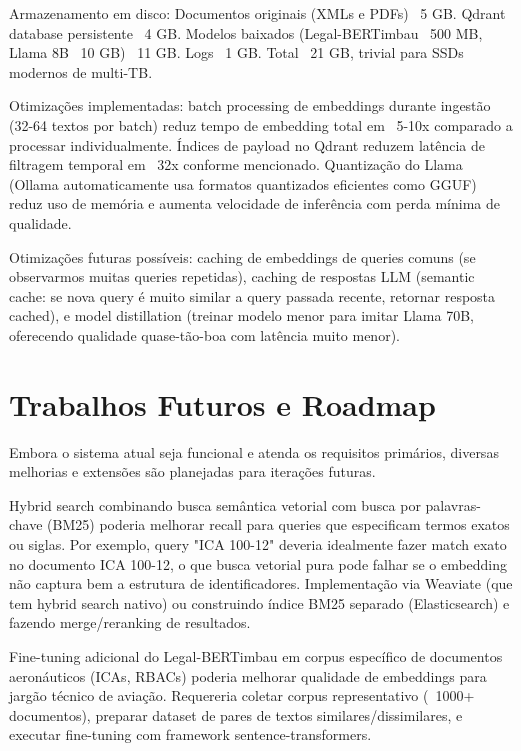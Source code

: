 \documentclass[12pt,a4paper]{article}
\begin{document}
Armazenamento em disco: Documentos originais (XMLs e PDFs) ~5 GB. Qdrant database persistente ~4 GB. Modelos baixados (Legal-BERTimbau ~500 MB, Llama 8B ~10 GB) ~11 GB. Logs ~1 GB. Total ~21 GB, trivial para SSDs modernos de multi-TB.

Otimizações implementadas: batch processing de embeddings durante ingestão (32-64 textos por batch) reduz tempo de embedding total em ~5-10x comparado a processar individualmente. Índices de payload no Qdrant reduzem latência de filtragem temporal em ~32x conforme mencionado. Quantização do Llama (Ollama automaticamente usa formatos quantizados eficientes como GGUF) reduz uso de memória e aumenta velocidade de inferência com perda mínima de qualidade.

Otimizações futuras possíveis: caching de embeddings de queries comuns (se observarmos muitas queries repetidas), caching de respostas LLM (semantic cache: se nova query é muito similar a query passada recente, retornar resposta cached), e model distillation (treinar modelo menor para imitar Llama 70B, oferecendo qualidade quase-tão-boa com latência muito menor).

\section{Trabalhos Futuros e Roadmap}

Embora o sistema atual seja funcional e atenda os requisitos primários, diversas melhorias e extensões são planejadas para iterações futuras.

Hybrid search combinando busca semântica vetorial com busca por palavras-chave (BM25) poderia melhorar recall para queries que especificam termos exatos ou siglas. Por exemplo, query "ICA 100-12" deveria idealmente fazer match exato no documento ICA 100-12, o que busca vetorial pura pode falhar se o embedding não captura bem a estrutura de identificadores. Implementação via Weaviate (que tem hybrid search nativo) ou construindo índice BM25 separado (Elasticsearch) e fazendo merge/reranking de resultados.

Fine-tuning adicional do Legal-BERTimbau em corpus específico de documentos aeronáuticos (ICAs, RBACs) poderia melhorar qualidade de embeddings para jargão técnico de aviação. Requereria coletar corpus representativo (~1000+ documentos), preparar dataset de pares de textos similares/dissimilares, e executar fine-tuning com framework sentence-transformers.
\end{document}

